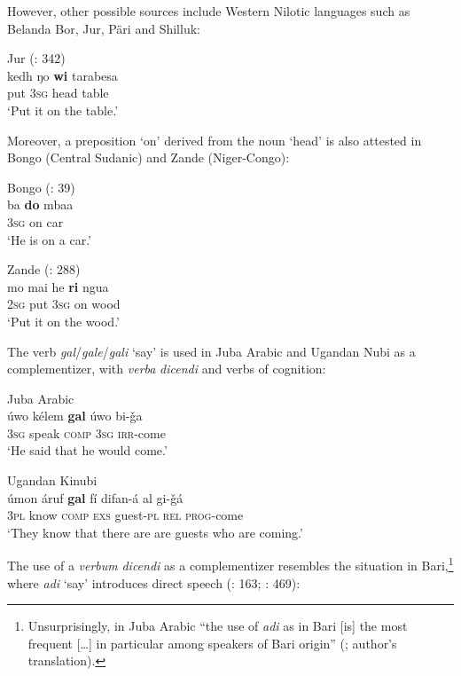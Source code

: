 \documentclass[output=paper]{langsci/langscibook}
\begin{document}
However, other possible sources include Western Nilotic languages such as Belanda Bor, Jur, Päri and Shilluk:

\ea\label{ex:key:}
{Jur  (\citealt{PozzatiPanza1993}: 342)}\\
\gll     kedh ŋo \textbf{wi} tarabesa\\
         put 3\textsc{sg} head table\\
\glt     `Put it on the table.'
\z

Moreover, a preposition ‘on’ derived from the noun ‘head’ is also attested in Bongo (Central Sudanic) and Zande (Niger-Congo):

\ea\label{ex:key:}
{Bongo (\citealt{Moietal2014}: 39)}\\
\gll            ba \textbf{do} mbaa\\
                3\textsc{sg} on car\\
\glt     `He is on a car.'
\z

\ea\label{ex:key:}
{Zande (\citealt{DeAngelis2002}: 288)}\\
\gll            mo mai he \textbf{ri} ngua\\
                2\textsc{sg} put 3\textsc{sg} on wood\\
\glt     `Put it on the wood.'
\z

The verb \textit{gal}/\textit{gale}/\textit{gali} ‘say’ is used in Juba Arabic and Ugandan Nubi as a complementizer, with \textit{verba} \textit{dicendi} and verbs of cognition:

\ea\label{ex:key:}
\ea Juba Arabic \citep[469]{Miller2001}\\
\gll     úwo kélem \textbf{gal} úwo bi-ǧa\\
         3\textsc{sg} speak \textsc{comp} 3\textsc{sg} \textsc{irr}-come\\
\glt       `He said that he would come.'

\ex\label{ex:key:}
Ugandan Kinubi \citep[204]{Wellens2003}\\
\gll     úmon áruf \textbf{gal} fí difan-á al gi-ǧá\\
         3\textsc{pl} know \textsc{comp} \textsc{exs} guest-\textsc{pl} \textsc{rel} \textsc{prog}-come\\
\glt    `They know that there are are guests who are coming.' 
\z
\z

The use of a \textit{verbum} \textit{dicendi} as a complementizer resembles the situation in Bari,\footnote{Unsurprisingly, in Juba Arabic “the use of \textit{adi} as in Bari [is] the most frequent […] in particular among speakers of Bari origin” (\citealt[470]{Miller2001}; author's translation).} where \textit{adi} ‘say’ introduces direct speech (\citealt{Owens1997}: 163; \citealt{Miller2001}: 469): 
\end{document}
